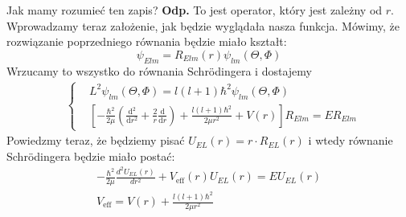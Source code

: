  Jak mamy rozumieć ten zapis? \textbf{Odp.} To jest operator, który jest zależny od $r$. Wprowadzamy teraz założenie, jak będzie wyglądała nasza funkcja. Mówimy, że rozwiązanie poprzedniego równania będzie miało kształt:
\begin{equation*}
	\psi_{Elm} = R_{Elm}(r) \psi_{lm}(\Theta, \Phi)
\end{equation*}
Wrzucamy to wszystko do równania Schrödingera i dostajemy
\begin{align*}
	&\left\{
	\begin{aligned}
		&L^2 \psi_{lm}(\Theta, \Phi) =  l(l+1) \hbar^2 \psi_{lm}(\Theta, \Phi)\\
		&\left[-\frac{\hbar^2}{2\mu} \left(\frac{\text{d}^2}{\text{d}r^2} + \frac2r \frac{\text{d}}{\text{d}r} \right) + \frac{l(l+1)\hbar^2}{2 \mu r^2} + V(r)\right] R_{Elm} = E R_{Elm}
	\end{aligned}
	\right.
\end{align*}
Powiedzmy teraz, że będziemy pisać $U_{EL}(r) = r \cdot R_{EL}(r)$ i wtedy równanie Schrödingera będzie miało postać:
\begin{equation*}
	\begin{gathered}
		-\frac{\hbar^2}{2\mu}\frac{d^2 U_{EL}(r)}{dr^2}+V_{\text{eff}}(r)U_{EL}(r)=EU_{EL}(r) \\
		V_{\text{eff}} = V(r)+\frac{l(l+1)\hbar^2}{2\mu r^2}
	\end{gathered}
\end{equation*}
